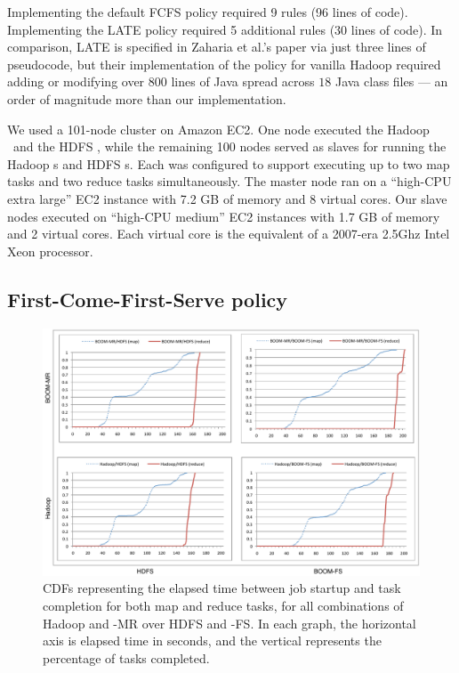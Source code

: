 Implementing the default FCFS policy required 9 rules (96 lines of
code). Implementing the LATE policy required 5 additional \OVERLOG rules (30
lines of code). In comparison, LATE is specified in Zaharia et al.'s paper via
just three lines of pseudocode, but their implementation of the policy for
vanilla Hadoop required adding or modifying over $800$ lines of Java spread 
across $18$ Java class files --- an order of magnitude more than our \OVERLOG implementation. 

We used a 101-node cluster on Amazon EC2. One node executed the Hadoop \JT\ 
and the HDFS \NN, while the remaining 100 nodes served as slaves for running the 
Hadoop {\TT}s and HDFS {\DN}s. Each {\TT} was configured to support executing up 
to two map tasks and two reduce tasks simultaneously. The master node ran on a 
``high-CPU extra large'' EC2 instance with 7.2 GB of memory and 8 virtual cores. 
Our slave nodes executed on ``high-CPU medium'' EC2 instances with 1.7 GB of 
memory and 2 virtual cores. Each virtual core is the equivalent of a 2007-era 2.5Ghz Intel Xeon
processor.


\subsection{First-Come-First-Serve policy}

\begin{figure}
\ssp
\centering
	\includegraphics[scale=0.75]{figures/fourgraphs}
\caption{CDFs representing the elapsed time between job startup and task
  completion for both map and reduce tasks, for all combinations of Hadoop and \BOOM-MR
  over HDFS and \BOOM-FS\@.  In each graph, the horizontal axis is
  elapsed time in seconds, and the vertical represents the percentage of tasks completed.}
\label{fig:ec2experiment}
\end{figure}

